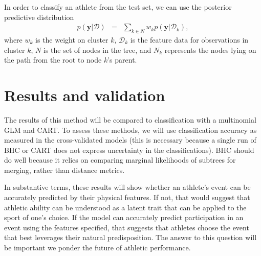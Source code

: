 \documentclass[twoside]{article}
\begin{document}
In order to classify an athlete from the test set, we can use the posterior predictive distribution
\begin{eqnarray*}
p(\mathbf{y}|\mathcal{D}) &=& \sum_{k \in N} w_k p(\mathbf{y}|\mathcal{D}_k),
\end{eqnarray*}
where $w_k$ is the weight on cluster $k$, $\mathcal{D}_k$ is the feature data for observations in cluster $k$, $N$ is the set of nodes in the tree, and $N_k$ represents the nodes lying on the path from the root to node $k$'s parent. 

\section{Results and validation}


The results of this method will be compared to classification with a multinomial GLM and CART. To assess these methods, we will use classification accuracy as measured in the cross-validated models (this is necessary because a single run of BHC or CART does not express uncertainty in the classifications). BHC should do well because it relies on comparing marginal likelihoods of subtrees for merging, rather than distance metrics.

In substantive terms, these results will show whether an athlete's event can be accurately predicted by their physical features. If not, that would suggest that athletic ability can be understood as a latent trait that can be applied to the sport of one's choice. If the model can accurately predict participation in an event using the features specified, that suggests that athletes choose the event that best leverages their natural predisposition. The answer to this question will be important we ponder the future of athletic performance.

\end{document}
